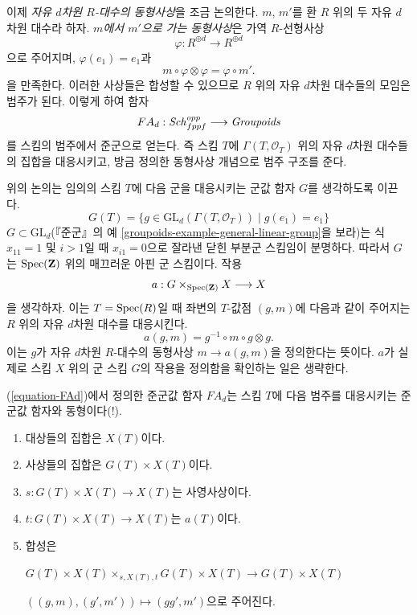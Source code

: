 \medskip\noindent
이제 {\it 자유 $d$차원 $R$-대수의 동형사상}을 조금 논의한다.
$m$, $m'$를 환 $R$ 위의 두 자유 $d$차원 대수라 하자.
{\it $m$에서 $m'$으로 가는 동형사상}은 가역 $R$-선형사상
$$
\varphi : R^{\oplus d} \longrightarrow R^{\oplus d}
$$
으로 주어지며, $\varphi(e_1) = e_1$과
$$
m \circ \varphi \otimes \varphi = \varphi \circ m'.
$$
을 만족한다. 이러한 사상들은 합성할 수 있으므로 $R$ 위의 자유
$d$차원 대수들의 모임은 범주가 된다. 이렇게 하여 함자
\begin{equation}
\label{equation-FAd}
FA_d : \mathit{Sch}_{fppf}^{opp} \longrightarrow \textit{Groupoids}
\end{equation}
를 스킴의 범주에서 준군으로 얻는다. 즉 스킴 $T$에
$\Gamma(T, \mathcal{O}_T)$ 위의 자유 $d$차원 대수들의 집합을
대응시키고, 방금 정의한 동형사상 개념으로 범주 구조를 준다.

\medskip\noindent
위의 논의는 임의의 스킴 $T$에 다음 군을 대응시키는 군값 함자
$G$를 생각하도록 이끈다.
$$
G(T) = \{g \in \text{GL}_d(\Gamma(T, \mathcal{O}_T)) \mid g(e_1) = e_1\}
$$
$G \subset \text{GL}_d$(『준군』의 예
\ref{groupoids-example-general-linear-group}을 보라)는 식
$x_{11} = 1$ 및 $i > 1$일 때 $x_{i1} = 0$으로 잘라낸
닫힌 부분군 스킴임이 분명하다. 따라서 $G$는
$\mathop{\mathrm{Spec}}(\mathbf{Z})$ 위의 매끄러운 아핀 군 스킴이다. 작용
$$
a : G \times_{\mathop{\mathrm{Spec}}(\mathbf{Z})} X \longrightarrow X
$$
을 생각하자. 이는 $T = \mathop{\mathrm{Spec}}(R)$일 때 좌변의 $T$-값점 $(g, m)$에
다음과 같이 주어지는 $R$ 위의 자유 $d$차원 대수를 대응시킨다.
$$
a(g, m) = g^{-1} \circ m \circ g \otimes g.
$$
이는 $g$가 자유 $d$차원 $R$-대수의 동형사상
$m \to a(g, m)$을 정의한다는 뜻이다. $a$가 실제로 스킴 $X$ 위의
군 스킴 $G$의 작용을 정의함을 확인하는 일은 생략한다.

\begin{lemma}
\label{lemma-represent-FAd}
(\ref{equation-FAd})에서 정의한 준군값 함자 $FA_d$는 스킴 $T$에
다음 범주를 대응시키는 준군값 함자와 동형이다(!).
\begin{enumerate}
\item 대상들의 집합은 $X(T)$이다.
\item 사상들의 집합은 $G(T) \times X(T)$이다.
\item $s : G(T) \times X(T) \to X(T)$는 사영사상이다.
\item $t : G(T) \times X(T) \to X(T)$는 $a(T)$이다.
\item 합성은
\par\noindent
$G(T) \times X(T) \times_{s, X(T), t} G(T) \times X(T)
\to G(T) \times X(T)$
\par\noindent
$((g, m), (g', m')) \mapsto (gg', m')$으로 주어진다.
\end{enumerate}
\end{lemma}

